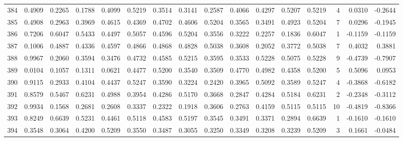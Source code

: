 \begin{tabular}{lrrrrrrrrrrrrrrr}
384 &      0.4909 &  0.2265 &  0.1788 &  0.4099 &  0.5219 &  0.3514 &  0.3141 &  0.2587 &  0.4066 &  0.4297 &   0.5207 &     0.5219 &      4 &                    0.0310 &                    -0.2644 \\
385 &      0.4908 &  0.2963 &  0.3969 &  0.4615 &  0.4369 &  0.4702 &  0.4606 &  0.5204 &  0.3565 &  0.3491 &   0.4923 &     0.5204 &      7 &                    0.0296 &                    -0.1945 \\
386 &      0.7206 &  0.6047 &  0.5433 &  0.4497 &  0.5057 &  0.4596 &  0.5204 &  0.3556 &  0.3222 &  0.2257 &   0.1836 &     0.6047 &      1 &                   -0.1159 &                    -0.1159 \\
387 &      0.1006 &  0.4887 &  0.4336 &  0.4597 &  0.4866 &  0.4868 &  0.4828 &  0.5038 &  0.3608 &  0.2052 &   0.3772 &     0.5038 &      7 &                    0.4032 &                     0.3881 \\
388 &      0.9967 &  0.2060 &  0.3594 &  0.3476 &  0.4732 &  0.4585 &  0.5215 &  0.3595 &  0.3533 &  0.5228 &   0.5075 &     0.5228 &      9 &                   -0.4739 &                    -0.7907 \\
389 &      0.0104 &  0.1057 &  0.1311 &  0.0621 &  0.4477 &  0.5200 &  0.3540 &  0.3509 &  0.4770 &  0.4982 &   0.4358 &     0.5200 &      5 &                    0.5096 &                     0.0953 \\
390 &      0.9115 &  0.2933 &  0.4104 &  0.4437 &  0.5247 &  0.3590 &  0.3224 &  0.2420 &  0.3965 &  0.5092 &   0.3589 &     0.5247 &      4 &                   -0.3868 &                    -0.6182 \\
391 &      0.8579 &  0.5467 &  0.6231 &  0.4988 &  0.3954 &  0.4286 &  0.5170 &  0.3668 &  0.2847 &  0.4284 &   0.5184 &     0.6231 &      2 &                   -0.2348 &                    -0.3112 \\
392 &      0.9934 &  0.1568 &  0.2681 &  0.2608 &  0.3337 &  0.2322 &  0.1918 &  0.3606 &  0.2763 &  0.4159 &   0.5115 &     0.5115 &     10 &                   -0.4819 &                    -0.8366 \\
393 &      0.8249 &  0.6639 &  0.5231 &  0.4461 &  0.5118 &  0.4583 &  0.5197 &  0.3545 &  0.3491 &  0.3371 &   0.2894 &     0.6639 &      1 &                   -0.1610 &                    -0.1610 \\
394 &      0.3548 &  0.3064 &  0.4200 &  0.5209 &  0.3550 &  0.3487 &  0.3055 &  0.3250 &  0.3349 &  0.3208 &   0.3239 &     0.5209 &      3 &                    0.1661 &                    -0.0484 \\

\end{tabular}
